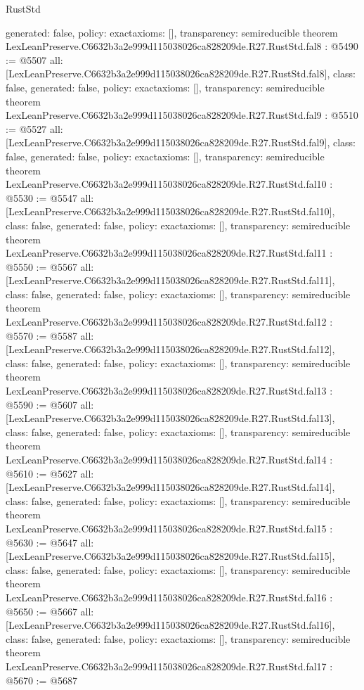 \begin{lexlean}{RustStd}
\begin{coremodule}
{  generated: false,
  policy: exact{axioms: []},
  transparency: semireducible
}
theorem LexLeanPreserve.C6632b3a2e999d115038026ca828209de.R27.RustStd.fal8 : @5490 := @5507 {
  all: [LexLeanPreserve.C6632b3a2e999d115038026ca828209de.R27.RustStd.fal8],
  class: false,
  generated: false,
  policy: exact{axioms: []},
  transparency: semireducible
}
theorem LexLeanPreserve.C6632b3a2e999d115038026ca828209de.R27.RustStd.fal9 : @5510 := @5527 {
  all: [LexLeanPreserve.C6632b3a2e999d115038026ca828209de.R27.RustStd.fal9],
  class: false,
  generated: false,
  policy: exact{axioms: []},
  transparency: semireducible
}
theorem LexLeanPreserve.C6632b3a2e999d115038026ca828209de.R27.RustStd.fal10 : @5530 := @5547 {
  all: [LexLeanPreserve.C6632b3a2e999d115038026ca828209de.R27.RustStd.fal10],
  class: false,
  generated: false,
  policy: exact{axioms: []},
  transparency: semireducible
}
theorem LexLeanPreserve.C6632b3a2e999d115038026ca828209de.R27.RustStd.fal11 : @5550 := @5567 {
  all: [LexLeanPreserve.C6632b3a2e999d115038026ca828209de.R27.RustStd.fal11],
  class: false,
  generated: false,
  policy: exact{axioms: []},
  transparency: semireducible
}
theorem LexLeanPreserve.C6632b3a2e999d115038026ca828209de.R27.RustStd.fal12 : @5570 := @5587 {
  all: [LexLeanPreserve.C6632b3a2e999d115038026ca828209de.R27.RustStd.fal12],
  class: false,
  generated: false,
  policy: exact{axioms: []},
  transparency: semireducible
}
theorem LexLeanPreserve.C6632b3a2e999d115038026ca828209de.R27.RustStd.fal13 : @5590 := @5607 {
  all: [LexLeanPreserve.C6632b3a2e999d115038026ca828209de.R27.RustStd.fal13],
  class: false,
  generated: false,
  policy: exact{axioms: []},
  transparency: semireducible
}
theorem LexLeanPreserve.C6632b3a2e999d115038026ca828209de.R27.RustStd.fal14 : @5610 := @5627 {
  all: [LexLeanPreserve.C6632b3a2e999d115038026ca828209de.R27.RustStd.fal14],
  class: false,
  generated: false,
  policy: exact{axioms: []},
  transparency: semireducible
}
theorem LexLeanPreserve.C6632b3a2e999d115038026ca828209de.R27.RustStd.fal15 : @5630 := @5647 {
  all: [LexLeanPreserve.C6632b3a2e999d115038026ca828209de.R27.RustStd.fal15],
  class: false,
  generated: false,
  policy: exact{axioms: []},
  transparency: semireducible
}
theorem LexLeanPreserve.C6632b3a2e999d115038026ca828209de.R27.RustStd.fal16 : @5650 := @5667 {
  all: [LexLeanPreserve.C6632b3a2e999d115038026ca828209de.R27.RustStd.fal16],
  class: false,
  generated: false,
  policy: exact{axioms: []},
  transparency: semireducible
}
theorem LexLeanPreserve.C6632b3a2e999d115038026ca828209de.R27.RustStd.fal17 : @5670 := @5687 {
}
\end{coremodule}
\end{lexlean}
